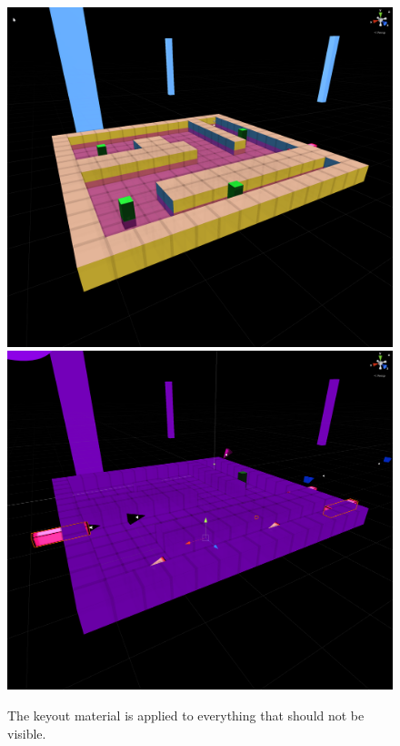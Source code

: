 \begin{figure}[p]
  \centering
  \includegraphics[width=\imgWidth]{images/neural_network_systems/NoKeyout.png} \\[\picVdist]
  \includegraphics[width=\imgWidth]{images/neural_network_systems/WithKeyout.png}
  \caption{The keyout material is applied to everything that should not be visible.}
  \label{KeyoutEditor}
\end{figure}

